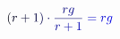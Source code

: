 \documentclass[12pt]{article}
\begin{document}
\makeatletter
\renewcommand*{\@textcolor}[3]{%
  \protect\leavevmode
  \begingroup
    \color#1{#2}#3%
  \endgroup
}
\makeatother
\begin{displaymath}
\mathcolor[RGB]{0,0,15}{(} \mathcolor[RGB]{0,0,30}{r} \mathcolor[RGB]{0,0,45}{+} \mathcolor[RGB]{0,0,60}{1} \mathcolor[RGB]{0,0,75}{)} \mathcolor[RGB]{0,0,90}{\cdot} \mathcolor[RGB]{0,0,105}{\frac { \mathcolor[RGB]{0,0,120}{r} \mathcolor[RGB]{0,0,135}{g} } { \mathcolor[RGB]{0,0,150}{r} \mathcolor[RGB]{0,0,165}{+} \mathcolor[RGB]{0,0,180}{1} } } \mathcolor[RGB]{0,0,195}{=} \mathcolor[RGB]{0,0,210}{r} \mathcolor[RGB]{0,0,225}{g}
\end{displaymath}
\end{document}
